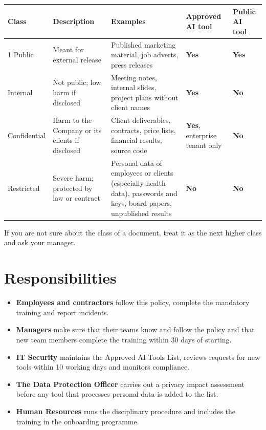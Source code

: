\documentclass[10.5pt,a4paper]{article}
\newcommand{\yes}{\textbf{Yes}}
\newcommand{\no}{\textbf{No}}
\begin{document}
\begin{center}
\small
{}
\begin{tabularx}{\linewidth}{@{}l >{\raggedright\arraybackslash}p{3.6cm} >{\raggedright\arraybackslash}X >{\centering\arraybackslash}p{2.0cm} >{\centering\arraybackslash}p{1.6cm}@{}}
  \toprule
  \textbf{Class} & \textbf{Description} & \textbf{Examples} & \textbf{Approved AI tool} & \textbf{Public AI tool} \\
  \midrule
  1 Public & Meant for external release & Published marketing material, job adverts, press releases & \yes & \yes \\
  \addlinespace[3pt]
  2 Internal & Not public; low harm if disclosed & Meeting notes, internal slides, project plans without client names & \yes & \no \\
  \addlinespace[3pt]
  3 Confidential & Harm to the Company or its clients if disclosed & Client deliverables, contracts, price lists, financial results, source code & \yes, enterprise tenant only & \no \\
  \addlinespace[3pt]
  4 Restricted & Severe harm; protected by law or contract & Personal data of employees or clients (especially health data), passwords and keys, board papers, unpublished results & \no & \no \\
  \bottomrule
\end{tabularx}
\end{center}
If you are not sure about the class of a document, treat it as the next higher class and ask your manager.

\section{Responsibilities}
\begin{itemize}[leftmargin=1.4em, itemsep=0.25em]
  \item \textbf{Employees and contractors} follow this policy, complete the mandatory training and report incidents.
  \item \textbf{Managers} make sure that their teams know and follow the policy and that new team members complete
        the training within 30 days of starting.
  \item \textbf{IT Security} maintains the Approved AI Tools List, reviews requests for new tools within 10 working days
        and monitors compliance.
  \item \textbf{The Data Protection Officer} carries out a privacy impact assessment before any tool that processes
        personal data is added to the list.
  \item \textbf{Human Resources} runs the disciplinary procedure and includes the training in the onboarding programme.
\end{itemize}
\end{document}
